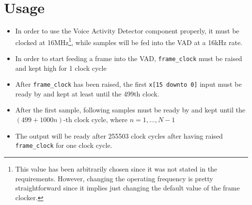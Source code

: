 \section{Usage}
\begin{itemize}
  \item In order to use the Voice Activity Detector component properly,
        it must be clocked at 16\si{\mega\hertz}\footnote{This value has been 
        arbitrarily chosen since it was not stated in the requirements. However, 
        changing the operating frequency is pretty straightforward since it implies
        just changing the default value of the frame clocker.}, while samples will be fed
        into the VAD at a 16\si{\kilo\hertz} rate.
  \item In order to start feeding a frame into the VAD,
        \texttt{frame\_clock} must be raised and kept high for 1 clock cycle
  \item After \texttt{frame\_clock} has been raised,
        the first \texttt{x[15 downto 0]} input must be ready by
        and kept at least until the 499th clock.
  \item After the first sample, following samples must be ready by
        and kept until the $(499 + 1000n)$-th clock cycle, where
        $n = 1, \dots, N - 1$
  \item The output will be ready after 255503 clock cycles after having raised
        \texttt{frame\_clock} for one clock cycle.
\end{itemize}
